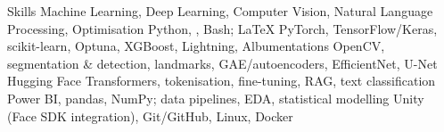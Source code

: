 
\begin{rubric}{Skills}
\noentry{~}
  Machine Learning, Deep Learning, Computer Vision, Natural Language Processing, Optimisation
\entry*[Programming]
  Python, , Bash; \LaTeX
\entry*[ML/DL]
  PyTorch, TensorFlow/Keras, scikit-learn, Optuna, XGBoost, Lightning, Albumentations
\entry*[CV]
  OpenCV, segmentation \& detection, landmarks, GAE/autoencoders, EfficientNet, U-Net
\entry*[NLP]
  Hugging Face Transformers, tokenisation, fine-tuning, RAG, text classification
\entry*[Data]
  Power BI, pandas, NumPy; data pipelines, EDA, statistical modelling
\entry*[Platforms]
  Unity (Face SDK integration), Git/GitHub, Linux, Docker
\end{rubric}
